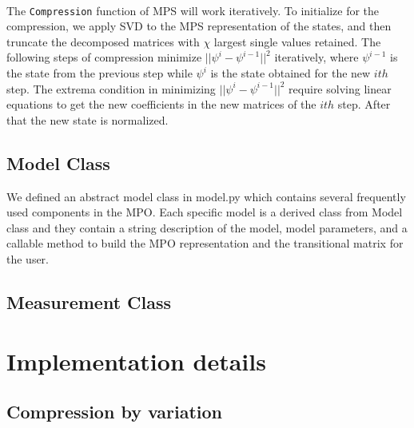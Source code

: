 \documentclass[english]{article}
\begin{document}
\\[3mm]
The \texttt{Compression} function of MPS will work iteratively. To initialize for the compression, we apply SVD to the MPS representation of the states, and then truncate the decomposed matrices with $\chi$ largest single values retained. The following steps of compression minimize $||\psi^i-\psi^{i-1} ||^{2}$ iteratively, where $\psi^{i-1}$ is the state from the previous step while $\psi^i$ is the state obtained for the new $ith$ step. The extrema condition in minimizing $||\psi^i-\psi^{i-1} ||^{2}$ require solving linear equations to get the new coefficients in the new matrices of the $ith$ step. After that the new state is normalized.
\\[3mm]

\subsection{Model Class}
We defined an abstract model class in model.py which contains several frequently used components in the MPO. Each specific model is a derived class from Model class and they contain a string description of the model, model parameters, and a callable method to build the MPO representation and the transitional matrix for the user.

\subsection{Measurement Class}

\vspace{3mm}

\section{Implementation details}
\subsection{Compression by variation}
\end{document}
